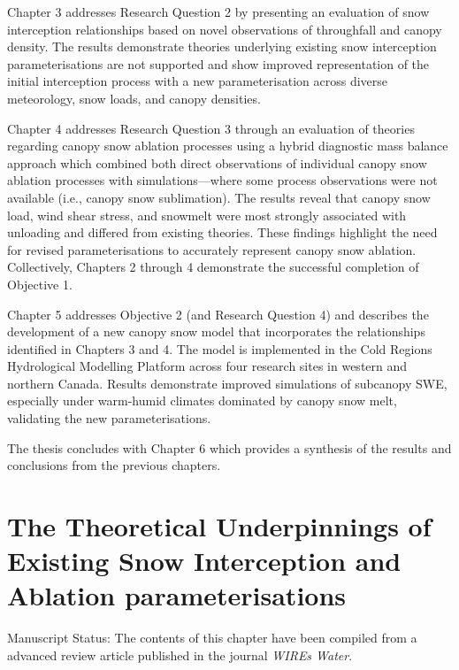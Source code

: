 \documentclass[
  letterpaper,
]{tex/uofsthesis-cs}
\begin{document}
Chapter 3 addresses Research Question 2 by presenting an evaluation of
snow interception relationships based on novel observations of
throughfall and canopy density. The results demonstrate theories
underlying existing snow interception parameterisations are not
supported and show improved representation of the initial interception
process with a new parameterisation across diverse meteorology, snow
loads, and canopy densities.

Chapter 4 addresses Research Question 3 through an evaluation of
theories regarding canopy snow ablation processes using a hybrid
diagnostic mass balance approach which combined both direct observations
of individual canopy snow ablation processes with simulations---where
some process observations were not available (i.e., canopy snow
sublimation). The results reveal that canopy snow load, wind shear
stress, and snowmelt were most strongly associated with unloading and
differed from existing theories. These findings highlight the need for
revised parameterisations to accurately represent canopy snow ablation.
Collectively, Chapters 2 through 4 demonstrate the successful completion
of Objective 1.

Chapter 5 addresses Objective 2 (and Research Question 4) and describes
the development of a new canopy snow model that incorporates the
relationships identified in Chapters 3 and 4. The model is implemented
in the Cold Regions Hydrological Modelling Platform across four research
sites in western and northern Canada. Results demonstrate improved
simulations of subcanopy SWE, especially under warm-humid climates
dominated by canopy snow melt, validating the new parameterisations.

The thesis concludes with Chapter 6 which provides a synthesis of the
results and conclusions from the previous chapters.

\pagebreak


\chapter{The Theoretical Underpinnings of Existing Snow Interception and
Ablation
parameterisations}\label{the-theoretical-underpinnings-of-existing-snow-interception-and-ablation-parameterisations}

Manuscript Status: The contents of this chapter have been compiled from
a advanced review article published in the journal \emph{WIREs Water}.
\end{document}

